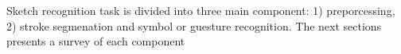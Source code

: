  




Sketch recognition task is divided into three main component: 1) preporcessing, 2) stroke segmenation and symbol or guesture recognition. The next sections presents a survey of each component
  

